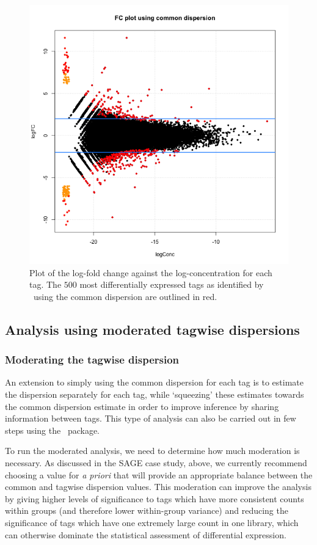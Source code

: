 \begin{figure}[ht]
\begin{center}
\includegraphics[height=0.45\textheight]{edgeR_case_study_longSAGE-015.png}
\caption{Plot of the log-fold change against the log-concentration for each tag. The $500$ most differentially expressed tags as identified by \edgeR~using the common dispersion are outlined in red.}
\label{fig:longSAGE_FC1}
\end{center}
\end{figure}


\subsection{Analysis using moderated tagwise dispersions}
\subsubsection{Moderating the tagwise dispersion}
An extension to simply using the common dispersion for each tag is to
estimate the dispersion separately for each tag, while `squeezing'
these estimates towards the common dispersion estimate in order to
improve inference by sharing information between tags. This type of
analysis can also be carried out in few steps using the
\edgeR~package.

To run the moderated analysis, we need to determine how much
moderation is necessary. As discussed in the SAGE case study, above,
we currently recommend choosing a
value for  \emph{a priori} that will provide an
appropriate balance between the common and tagwise dispersion
values. This moderation can improve the analysis by giving higher
levels of significance to tags which have more consistent counts
within groups (and therefore lower within-group variance) and reducing
the significance of tags which have one extremely large count in one
library, which can otherwise dominate the statistical assessment of
differential expression. 


